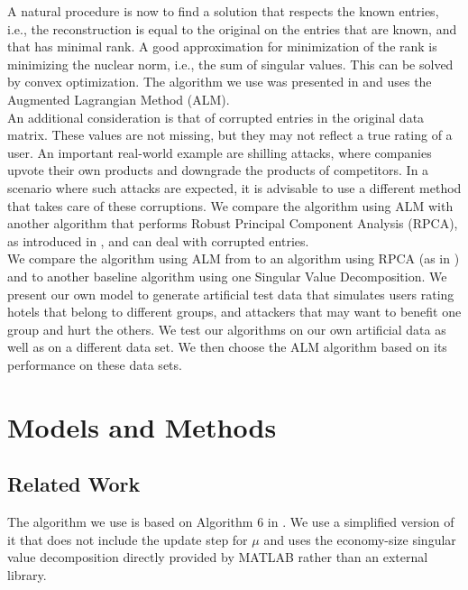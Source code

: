 \documentclass[10pt,conference,compsocconf]{IEEEtran}
\begin{document}
A natural procedure is now to find a solution that respects the known entries, i.e., the reconstruction is equal 
to the original on the entries that are known, and that has minimal rank. A good approximation for minimization
of the rank is minimizing the nuclear norm, i.e., the sum of singular values. This can be solved by convex optimization. 
The algorithm we use was presented in \cite{almpaper} and uses the Augmented Lagrangian Method (ALM). \\

An additional consideration is that of corrupted entries in the original data matrix. These values are not missing,
but they may not reflect a true rating of a user. An important real-world example are shilling attacks, where companies
upvote their own products and downgrade the products of competitors. In a scenario where such attacks are expected, it
is advisable to use a different method that takes care of these corruptions. We compare the algorithm using ALM with another algorithm that performs Robust Principal Component Analysis (RPCA), as introduced in \cite{rpcapaper}, and can deal with corrupted entries. \\

We compare the algorithm using ALM from \cite{almpaper} to an algorithm using RPCA (as in \cite{rpcapaper}) and to another baseline algorithm using one Singular Value Decomposition. We present our own model to generate artificial test data that simulates users rating hotels that belong to different groups, and attackers that may want to benefit one group and hurt the others. We test our algorithms on our own artificial data as well as on a different data set. We then choose the ALM algorithm based on its performance on these data sets.

\section{Models and Methods}

\subsection{Related Work}

The algorithm we use is based on Algorithm 6 in \cite{almpaper}.
We use a simplified version of it that does not include the update step
for $\mu$ and uses the economy-size singular value decomposition directly
provided by MATLAB rather than an external library. \\
\end{document}
